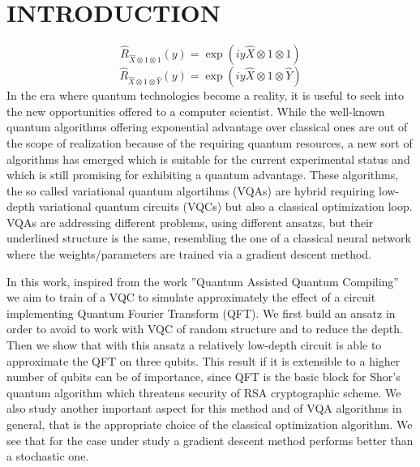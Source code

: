 \documentclass[inscr,ack,preface]{diphdthesis}
\begin{document}
\frontmatter


\mainmatter

\chapter{INTRODUCTION}
\begin{equation}
\hat{R}_{\hat{X}\otimes 1\otimes1}(y)=\exp(i y \hat{X}\otimes 1\otimes1)
\end{equation}
\begin{equation}
\hat{R}_{\hat{X}\otimes 1\otimes \hat{Y}}(y)=\exp(i y \hat{X}\otimes 1\otimes\hat{Y})
\end{equation}
In the era where quantum technologies become a reality, it is useful to seek into the 
new opportunities offered to a computer scientist. While the well-known quantum algorithms
offering exponential advantage over classical ones are out of the scope of realization because of
the requiring  quantum resources, a new sort of algorithms  has emerged
which is suitable for the current experimental status and which is still promising for exhibiting a quantum advantage.
These algorithms,  the so called variational quantum algortihms (VQAs) are hybrid requiring low-depth variational  quantum circuits (VQCs) but also a classical optimization loop. VQAs are addressing different problems, using different ansatzs, but their underlined structure
is the same, resembling the one of a classical neural network where the weights/parameters are trained via a gradient descent method. 

In this work, inspired from the work ''Quantum Assisted Quantum Compiling'' we aim to train of a VQC to simulate approximately 
the effect of a circuit implementing Quantum Fourier Transform (QFT). We first build an ansatz in order to avoid to work with VQC of random structure and to  reduce the depth. Then we show that with this ansatz a relatively low-depth circuit is able to approximate the QFT on three qubits. This result if it is extensible to a higher number of qubits can be of importance, since QFT is the basic block for Shor's quantum algorithm which threatens security of RSA cryptographic scheme.
We also study another important aspect for this method and of VQA algorithms in general, that is the appropriate choice
of the classical optimization algorithm. We see that for the case under study a gradient descent method performs better
than a stochastic one.
 
\end{document}
